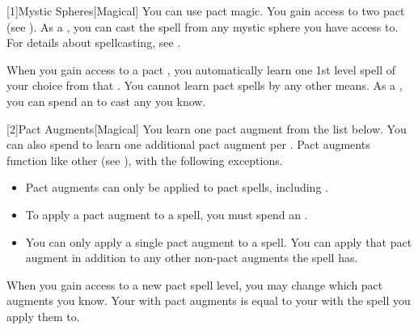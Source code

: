         [1]{Mystic Spheres}[Magical]
        You can use pact magic.
        You gain access to two pact  (see ).
        As a , you can cast the  spell from any mystic sphere you have access to.
        For details about spellcasting, see .

        When you gain access to a pact , you automatically learn one 1st level spell of your choice from that .
        You cannot learn pact spells by any other means.
        As a , you can spend an  to cast any  you know.

        [2]{Pact Augments}[Magical] You learn one pact augment from the list below.
        You can also spend  to learn one additional pact augment per .
        Pact augments function like other  (see ), with the following exceptions.
        \begin{itemize}
            \item Pact augments can only be applied to pact spells, including .
            \item To apply a pact augment to a spell, you must spend an .
            \item You can only apply a single pact augment to a spell.
                You can apply that pact augment in addition to any other non-pact augments the spell has.
        \end{itemize}
        When you gain access to a new pact spell level, you may change which pact augments you know.
        Your  with pact augments is equal to your  with the spell you apply them to.
